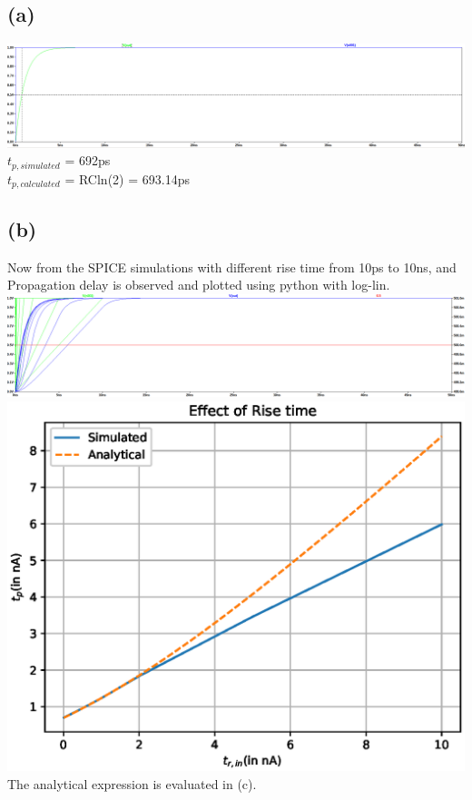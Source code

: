\documentclass{article}
\begin{document}
\subsection*{(a)}
\includegraphics[scale=0.28]{./figs/Q5.png}\\
$t_{p, simulated}$ = 692ps\\
$t_{p, calculated}$ = RCln(2) = 693.14ps
\subsection*{(b)}
Now from the SPICE simulations with different rise time from 10ps to 10ns, and Propagation delay is observed and plotted using python with log-lin.\\
\includegraphics[scale=0.28]{./figs/Q5_b_plots.png}\\

\includegraphics[scale=0.7]{./figs/Q5_b.eps}\\
The analytical expression is evaluated in (c).
\end{document}
